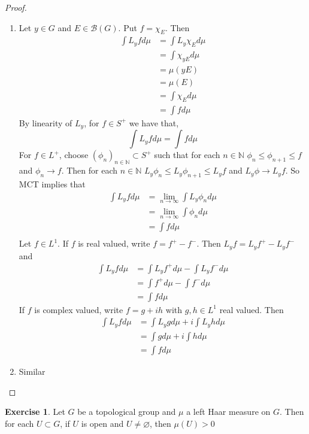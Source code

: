 \documentclass[12pt]{amsart}
\theoremstyle{definition}
\newtheorem{ex}[definition]{Exercise}
\newcommand{\N}{\mathbb{N}}
\newcommand{\MB}{\mathcal{B}}
\newcommand{\limn}{\lim \limits_{n \rightarrow \infty}}
\newcommand{\seq}[2]{(#1_{#2})_{#2 \in \N}}
\begin{document}
	\begin{proof}\
		\begin{enumerate}
			\item Let $y \in G$ and $E \in \MB(G)$. Put $f = \chi_E$. Then 
			\begin{align*}
				\int L_y f d \mu 
				& = \int L_y\chi_E d \mu \\
				& =  \int \chi_{yE} d\mu \\
				& = \mu(yE) \\
				& = \mu(E) \\
				& = \int \chi_E d\mu \\
				& = \int f d \mu
			\end{align*} 
			By linearity of $L_y$, for $f \in S^+$ we have that, $$\int L_y f d \mu = \int f d \mu$$ For $f \in L^+$, choose $\seq{\phi}{n} \subset S^+$ such that for each $n \in \N$ $\phi_n \leq \phi_{n+1} \leq f$ and $\phi_n \rightarrow f$. Then for each $n \in \N$ $L_y \phi_n \leq L_y \phi_{n+1} \leq L_y f$ and $L_y \phi \rightarrow L_y f$. So MCT implies that 
			\begin{align*}
				\int L_y f d \mu 
				& = \limn \int L_y \phi_n d \mu \\
				& = \limn \int \phi_n d \mu \\
				& = \int f d \mu \\
			\end{align*}
			Let $f \in L^1$. If $f$ is real valued, write $f = f^+ - f^-$. Then $L_y f = L_y f^+ - L_y f^-$ and 
			\begin{align*}
				\int L_yf d \mu 
				& = \int L_y f^+ d \mu - \int L_y f^- d \mu \\
				& = \int f^+ d \mu - \int f^- d \mu \\
				& = \int f d \mu
			\end{align*}
			If $f$ is complex valued, write $f = g + ih$ with $g, h \in L^1$ real valued. Then 
			\begin{align*}
				\int L_yf d \mu 
				& = \int L_y g d \mu + i \int L_y h d \mu \\
				& = \int g d \mu +i \int h d \mu \\
				& = \int f d \mu
			\end{align*}
			\item Similar
		\end{enumerate}
	\end{proof}
	
	\begin{ex}
		Let $G$ be a topological group and $\mu$ a left Haar measure on $G$. Then for each $U \subset G$, if $U$ is open and $U \neq \varnothing$, then $\mu(U) > 0$
	\end{ex}
\end{document}

